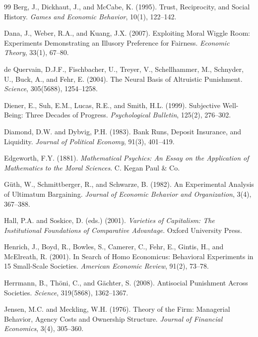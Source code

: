 \documentclass[12pt,a4paper]{article}
\begin{document}
\begin{thebibliography}{99}
Berg, J., Dickhaut, J., and McCabe, K. (1995).
Trust, Reciprocity, and Social History.
\emph{Games and Economic Behavior}, 10(1), 122–142.

Dana, J., Weber, R.A., and Kuang, J.X. (2007).
Exploiting Moral Wiggle Room: Experiments Demonstrating an Illusory Preference for Fairness.
\emph{Economic Theory}, 33(1), 67–80.

de Quervain, D.J.F., Fischbacher, U., Treyer, V., Schellhammer, M., Schnyder, U., Buck, A., and Fehr, E. (2004).
The Neural Basis of Altruistic Punishment.
\emph{Science}, 305(5688), 1254–1258.

Diener, E., Suh, E.M., Lucas, R.E., and Smith, H.L. (1999).
Subjective Well-Being: Three Decades of Progress.
\emph{Psychological Bulletin}, 125(2), 276–302.

Diamond, D.W. and Dybvig, P.H. (1983).
Bank Runs, Deposit Insurance, and Liquidity.
\emph{Journal of Political Economy}, 91(3), 401–419.

Edgeworth, F.Y. (1881).
\emph{Mathematical Psychics: An Essay on the Application of Mathematics to the Moral Sciences}.
C. Kegan Paul \& Co.

Güth, W., Schmittberger, R., and Schwarze, B. (1982).
An Experimental Analysis of Ultimatum Bargaining.
\emph{Journal of Economic Behavior and Organization}, 3(4), 367–388.

Hall, P.A. and Soskice, D. (eds.) (2001).
\emph{Varieties of Capitalism: The Institutional Foundations of Comparative Advantage}.
Oxford University Press.

Henrich, J., Boyd, R., Bowles, S., Camerer, C., Fehr, E., Gintis, H., and McElreath, R. (2001).
In Search of Homo Economicus: Behavioral Experiments in 15 Small-Scale Societies.
\emph{American Economic Review}, 91(2), 73–78.

Herrmann, B., Thöni, C., and Gächter, S. (2008).
Antisocial Punishment Across Societies.
\emph{Science}, 319(5868), 1362–1367.

Jensen, M.C. and Meckling, W.H. (1976).
Theory of the Firm: Managerial Behavior, Agency Costs and Ownership Structure.
\emph{Journal of Financial Economics}, 3(4), 305–360.


\end{thebibliography}
\end{document}
